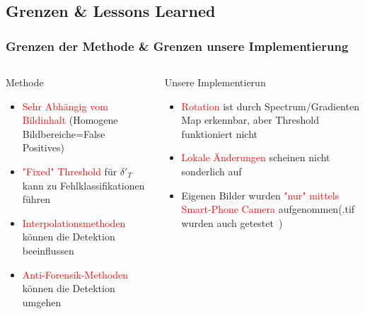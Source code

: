 \documentclass[11pt,t,usepdftitle=false,aspectratio=169]{beamer}
\begin{document}
\subsection{Grenzen \& Lessons Learned}

\begin{frame}
	\frametitle{Grenzen der Methode \& Grenzen unsere Implementierung}
	\vspace{-1em}
	\begin{columns}[T]
		\begin{column}{0.48\textwidth}
			\begin{alertblock}{Methode}
				\begin{itemize}
					\item \textcolor{red}{Sehr Abhängig vom Bildinhalt} (Homogene Bildbereiche=False Positives)
					\item \textcolor{red}{"Fixed" Threshold} für $\delta'_T$ kann zu Fehlklassifikationen führen
					\item \textcolor{red}{Interpolationsmethoden} können die Detektion beeinflussen
					\item \textcolor{red}{Anti-Forensik-Methoden} können die Detektion umgehen~\cite{kirchner_hiding_2008}
				\end{itemize}
			\end{alertblock}
		\end{column}
		\begin{column}{0.48\textwidth}
			\begin{exampleblock}{Unsere Implementierun}
				\begin{itemize}
					\item \textcolor{red}{Rotation} ist durch Spectrum/Gradienten Map erkennbar, aber Threshold funktioniert nicht
					\item \textcolor{red}{Lokale Änderungen} scheinen nicht sonderlich auf
					\item Eigenen Bilder wurden \textcolor{red}{"nur" mittels Smart-Phone Camera} aufgenommen(.tif wurden auch getestet~\cite{noauthor_columbia_nodate})
				\end{itemize}
			\end{exampleblock}
		\end{column}
	\end{columns}
\end{frame}
\end{document}
